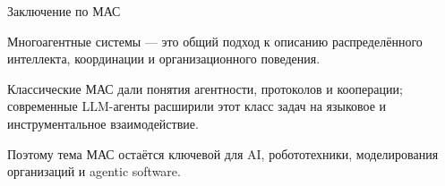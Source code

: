 \begin{frame}{Заключение по МАС}
	\topline
	\justifying
	\begin{textitemize}
		\item Многоагентные системы --- это общий подход к описанию распределённого интеллекта, координации и организационного поведения.
		\item Классические МАС дали понятия агентности, протоколов и кооперации; современные LLM-агенты расширили этот класс задач на языковое и инструментальное взаимодействие.
		\item Поэтому тема МАС остаётся ключевой для AI, робототехники, моделирования организаций и agentic software.
	\end{textitemize}
\end{frame}

